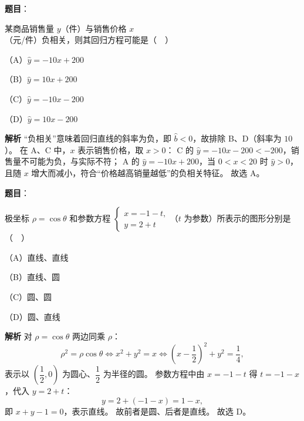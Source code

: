 \begin{answer}

\textbf{题目}：

某商品销售量 $y$（件）与销售价格 $x$（元/件）负相关，则其回归方程可能是（　）

（A）$\hat y=-10x+200$

（B）$\hat y=10x+200$

（C）$\hat y=-10x-200$

（D）$\hat y=10x-200$

\textbf{解析}
“负相关”意味着回归直线的斜率为负，即 $\hat b<0$，故排除 B、D（斜率为 $10$）。
在 A、C 中，$x$ 表示销售价格，取 $x>0$：
C 的 $\hat y=-10x-200<-200$，销售量不可能为负，与实际不符；
A 的 $\hat y=-10x+200$，当 $0<x<20$ 时 $\hat y>0$，且随 $x$ 增大而减小，符合“价格越高销量越低”的负相关特征。
故选 A。


\end{answer}
\begin{answer}

\textbf{题目}：

极坐标 $\rho=\cos\theta$ 和参数方程 $\begin{cases}x=-1-t,\\ y=2+t\end{cases}$（$t$ 为参数）所表示的图形分别是（　）

（A）直线、直线

（B）直线、圆

（C）圆、圆

（D）圆、直线

\textbf{解析}
对 $\rho=\cos\theta$ 两边同乘 $\rho$：
\nopagebreak[4]
\[\rho^2=\rho\cos\theta\iff x^2+y^2=x\iff\left(x-\frac12\right)^2+y^2=\frac14,\]
表示以 $\left(\dfrac12,0\right)$ 为圆心、$\dfrac12$ 为半径的圆。
参数方程中由 $x=-1-t$ 得 $t=-1-x$，代入 $y=2+t$：
\nopagebreak[4]
\[y=2+(-1-x)=1-x,\]
即 $x+y-1=0$，表示直线。
故前者是圆、后者是直线。
故选 D。


\end{answer}
